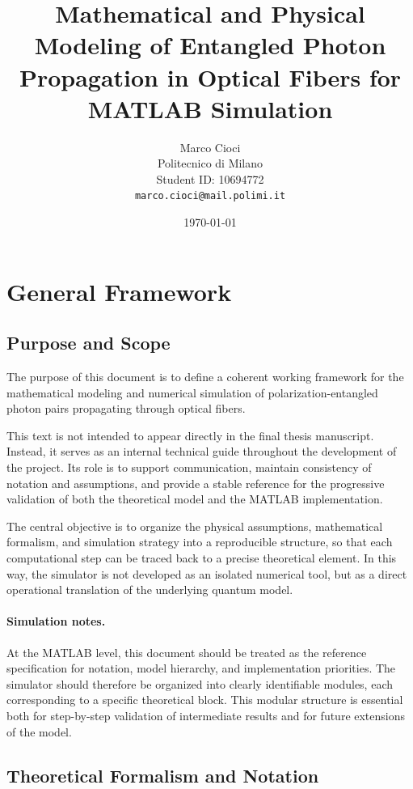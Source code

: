 \documentclass[a4paper]{article}
\title{Mathematical and Physical Modeling of Entangled Photon Propagation in Optical Fibers for MATLAB Simulation}
\author{Marco Cioci\\
Politecnico di Milano\\
Student ID: 10694772\\
\texttt{marco.cioci@mail.polimi.it}}
\date{\today}
\begin{document}
\maketitle

\tableofcontents

\newpage
\section{General Framework}

\subsection{Purpose and Scope}
The purpose of this document is to define a coherent working framework for the mathematical modeling and numerical simulation of polarization-entangled photon pairs propagating through optical fibers.

This text is not intended to appear directly in the final thesis manuscript. Instead, it serves as an internal technical guide throughout the development of the project. Its role is to support communication, maintain consistency of notation and assumptions, and provide a stable reference for the progressive validation of both the theoretical model and the MATLAB implementation.

The central objective is to organize the physical assumptions, mathematical formalism, and simulation strategy into a reproducible structure, so that each computational step can be traced back to a precise theoretical element. In this way, the simulator is not developed as an isolated numerical tool, but as a direct operational translation of the underlying quantum model.

\paragraph{Simulation notes.}
At the MATLAB level, this document should be treated as the reference specification for notation, model hierarchy, and implementation priorities. The simulator should therefore be organized into clearly identifiable modules, each corresponding to a specific theoretical block. This modular structure is essential both for step-by-step validation of intermediate results and for future extensions of the model.

\subsection{Theoretical Formalism and Notation}
\end{document}
